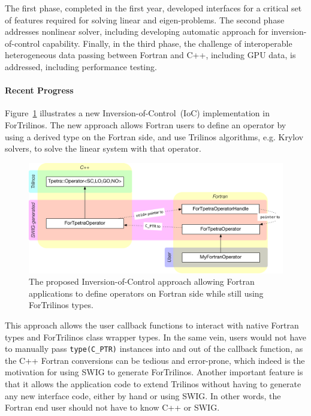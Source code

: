 The first phase, completed in the first year, developed interfaces for a critical set of features required for solving linear and eigen-problems. The second phase addresses nonlinear solver, including developing automatic approach for inversion-of-control capability. Finally, in the third phase, the challenge of interoperable heterogeneous data passing between Fortran and C++, including GPU data, is addressed, including performance testing.

\paragraph{Recent Progress}

Figure~\ref{fig:fortran_ioc} illustrates a new Inversion-of-Control~(IoC)
implementation in ForTrilinos. The new approach allows Fortran users to define
an operator by using a derived type on the Fortran side, and use Trilinos
algorithms, e.g. Krylov solvers, to solve the linear system with that operator.

\begin{figure}[htb]
    \centering
    \includegraphics[scale=0.8,width=6in]{projects/2.3.3-MathLibs/2.3.3.14-ALExa-ForTrilinos/ForTrilinos_ioc}
    \caption{\label{fig:fortran_ioc}The proposed Inversion-of-Control approach
    allowing Fortran applications to define operators on Fortran side while
    still using ForTrilinos types.}
\end{figure}

This approach allows the user callback functions to interact with native Fortran
types and ForTrilinos class wrapper types. In the same vein, users would not
have to manually pass \texttt{type(C\_PTR)} instances into and out of the
callback function, as the C++ Fortran conversions can be tedious and
error-prone, which indeed is the motivation for using SWIG to generate
ForTrilinos.  Another important feature is that it allows the application code
to extend Trilinos without having to generate any new interface code, either by
hand or using SWIG. In other words, the Fortran end user should not have to know
C++ or SWIG.

